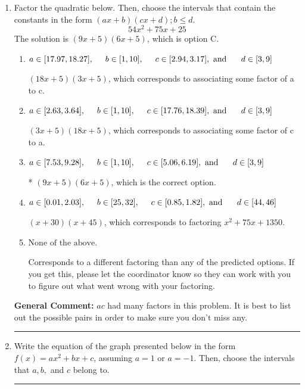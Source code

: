 \documentclass{extbook}[14pt]
\newcommand{\litem}[1]{\item #1

\rule{\textwidth}{0.4pt}}
\begin{document}
\begin{enumerate}\litem{
Factor the quadratic below. Then, choose the intervals that contain the constants in the form $(ax+b)(cx+d); b \leq d.$
\[ 54x^{2} +75 x + 25 \]The solution is \( (9x + 5)(6x + 5) \), which is option C.\begin{enumerate}[label=\Alph*.]
\item \( a \in [17.97, 18.27], \hspace*{5mm} b \in [1, 10], \hspace*{5mm} c \in [2.94, 3.17], \text{ and } \hspace*{5mm} d \in [3, 9] \)

 $(18x + 5)(3x + 5)$, which corresponds to associating some factor of a to c.
\item \( a \in [2.63, 3.64], \hspace*{5mm} b \in [1, 10], \hspace*{5mm} c \in [17.76, 18.39], \text{ and } \hspace*{5mm} d \in [3, 9] \)

 $(3x + 5)(18x + 5)$, which corresponds to associating some factor of c to a.
\item \( a \in [7.53, 9.28], \hspace*{5mm} b \in [1, 10], \hspace*{5mm} c \in [5.06, 6.19], \text{ and } \hspace*{5mm} d \in [3, 9] \)

* $(9x + 5)(6x + 5)$, which is the correct option.
\item \( a \in [0.01, 2.03], \hspace*{5mm} b \in [25, 32], \hspace*{5mm} c \in [0.85, 1.82], \text{ and } \hspace*{5mm} d \in [44, 46] \)

 $(x + 30)(x + 45)$, which corresponds to factoring $x^{2} +75 x + 1350$.
\item \( \text{None of the above.} \)

 Corresponds to a different factoring than any of the predicted options. If you get this, please let the coordinator know so they can work with you to figure out what went wrong with your factoring.
\end{enumerate}

\textbf{General Comment:} $ac$ had many factors in this problem. It is best to list out the possible pairs in order to make sure you don't miss any.
}
\litem{
Write the equation of the graph presented below in the form $f(x)=ax^2+bx+c$, assuming  $a=1$ or $a=-1$. Then, choose the intervals that $a, b,$ and $c$ belong to.

}
\end{enumerate}
\end{document}
